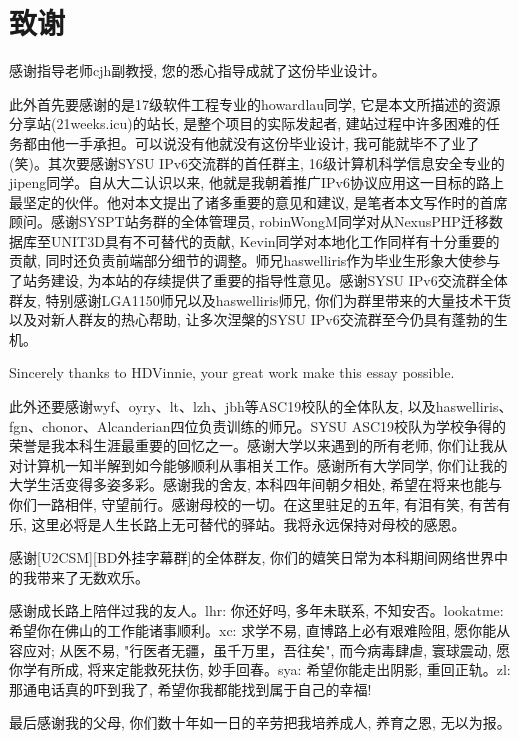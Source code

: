 
\chapter{致谢}

感谢指导老师cjh副教授, 您的悉心指导成就了这份毕业设计。

此外首先要感谢的是17级软件工程专业的howardlau同学, 它是本文所描述的资源分享站(21weeks.icu)的站长, 是整个项目的实际发起者, 建站过程中许多困难的任务都由他一手承担。可以说没有他就没有这份毕业设计, 我可能就毕不了业了(笑)。其次要感谢SYSU IPv6交流群的首任群主, 16级计算机科学信息安全专业的jipeng同学。自从大二认识以来, 他就是我朝着推广IPv6协议应用这一目标的路上最坚定的伙伴。他对本文提出了诸多重要的意见和建议, 是笔者本文写作时的首席顾问。感谢SYSPT站务群的全体管理员, robinWongM同学对从NexusPHP迁移数据库至UNIT3D具有不可替代的贡献, Kevin同学对本地化工作同样有十分重要的贡献, 同时还负责前端部分细节的调整。师兄haswelliris作为毕业生形象大使参与了站务建设, 为本站的存续提供了重要的指导性意见。感谢SYSU IPv6交流群全体群友, 特别感谢LGA1150师兄以及haswelliris师兄, 你们为群里带来的大量技术干货以及对新人群友的热心帮助, 让多次涅槃的SYSU IPv6交流群至今仍具有蓬勃的生机。

Sincerely thanks to HDVinnie, your great work make this essay possible.

此外还要感谢wyf、oyry、lt、lzh、jbh等ASC19校队的全体队友, 以及haswelliris、fgn、chonor、Alcanderian四位负责训练的师兄。SYSU ASC19校队为学校争得的荣誉是我本科生涯最重要的回忆之一。感谢大学以来遇到的所有老师, 你们让我从对计算机一知半解到如今能够顺利从事相关工作。感谢所有大学同学, 你们让我的大学生活变得多姿多彩。感谢我的舍友, 本科四年间朝夕相处, 希望在将来也能与你们一路相伴, 守望前行。感谢母校的一切。在这里驻足的五年, 有泪有笑, 有苦有乐, 这里必将是人生长路上无可替代的驿站。我将永远保持对母校的感恩。

感谢[U2CSM][BD外挂字幕群]的全体群友, 你们的嬉笑日常为本科期间网络世界中的我带来了无数欢乐。

感谢成长路上陪伴过我的友人。lhr: 你还好吗, 多年未联系, 不知安否。lookatme: 希望你在佛山的工作能诸事顺利。xc: 求学不易, 直博路上必有艰难险阻, 愿你能从容应对; 从医不易, "行医者无疆，虽千万里，吾往矣", 而今病毒肆虐, 寰球震动, 愿你学有所成, 将来定能救死扶伤, 妙手回春。sya: 希望你能走出阴影, 重回正轨。zl: 那通电话真的吓到我了, 希望你我都能找到属于自己的幸福!

最后感谢我的父母, 你们数十年如一日的辛劳把我培养成人, 养育之恩, 无以为报。
